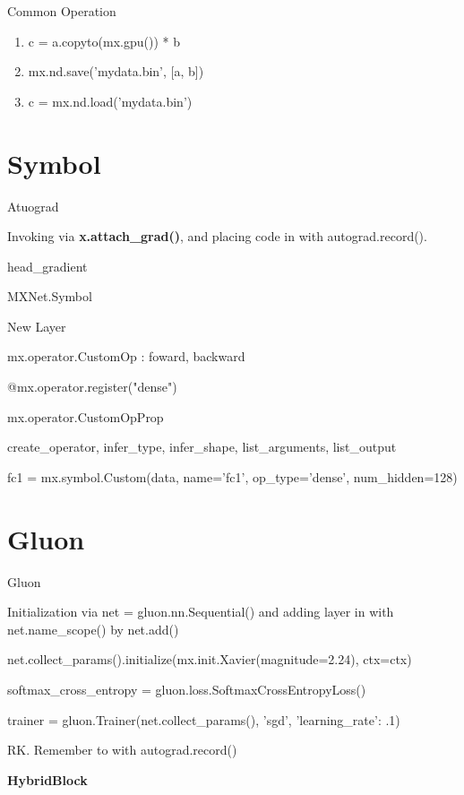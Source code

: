 \documentclass[english, nochinese]{../TeXTemplate/pkuslide}
\begin{document}
\begin{frame}{Common Operation}
\begin{enumerate}
    \item  c = a.copyto(mx.gpu()) * b
    \item mx.nd.save('mydata.bin', [a, b])  
    \item c = mx.nd.load('mydata.bin') 
    
\end{enumerate}
\end{frame}


\section{Symbol}

\begin{frame}{Atuograd}

Invoking via \textbf{x.attach\_grad()}, and placing code in with autograd.record().

head\_gradient

MXNet.Symbol

\end{frame}

\begin{frame}{New Layer}

mx.operator.CustomOp : foward, backward

@mx.operator.register("dense")  

mx.operator.CustomOpProp

create\_operator, infer\_type, infer\_shape, list\_arguments, list\_output

fc1 = mx.symbol.Custom(data, name='fc1', op\_type='dense', num\_hidden=128)

\end{frame}

\section{Gluon}

\begin{frame}{Gluon}

Initialization via net = gluon.nn.Sequential() and adding layer in with net.name\_scope() by net.add()

net.collect\_params().initialize(mx.init.Xavier(magnitude=2.24), ctx=ctx)

softmax\_cross\_entropy = gluon.loss.SoftmaxCrossEntropyLoss()


trainer = gluon.Trainer(net.collect\_params(), 'sgd', {'learning\_rate': .1})

RK. Remember to with autograd.record()

\textbf{HybridBlock}
\end{frame}
\end{document}
